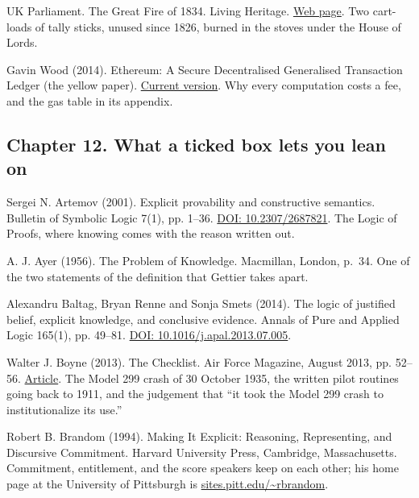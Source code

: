 \noindent UK Parliament. The Great Fire of 1834. Living Heritage. \href{https://www.parliament.uk/about/living-heritage/building/palace/architecture/palacestructure/great-fire/}{Web page}. Two cart-loads of tally sticks, unused since 1826, burned in the stoves under the House of Lords.
\par\medskip

\noindent Gavin Wood (2014). Ethereum: A Secure Decentralised Generalised Transaction Ledger (the yellow paper). \href{https://ethereum.github.io/yellowpaper/paper.pdf}{Current version}. Why every computation costs a fee, and the gas table in its appendix.
\par\medskip

\subsection*{Chapter 12. What a ticked box lets you lean on}

\noindent Sergei N. Artemov (2001). Explicit provability and constructive semantics. Bulletin of Symbolic Logic 7(1), pp. 1--36. \href{https://doi.org/10.2307/2687821}{DOI: 10.2307/2687821}. The Logic of Proofs, where knowing comes with the reason written out.
\par\medskip

\noindent A. J. Ayer (1956). The Problem of Knowledge. Macmillan, London, p.~34. One of the two statements of the definition that Gettier takes apart.
\par\medskip

\noindent Alexandru Baltag, Bryan Renne and Sonja Smets (2014). The logic of justified belief, explicit knowledge, and conclusive evidence. Annals of Pure and Applied Logic 165(1), pp. 49--81. \href{https://doi.org/10.1016/j.apal.2013.07.005}{DOI: 10.1016/j.apal.2013.07.005}.
\par\medskip

\noindent Walter J. Boyne (2013). The Checklist. Air Force Magazine, August 2013, pp. 52--56. \href{https://www.airandspaceforces.com/article/0813checklist/}{Article}. The Model 299 crash of 30 October 1935, the written pilot routines going back to 1911, and the judgement that ``it took the Model 299 crash to institutionalize its use.''
\par\medskip

\noindent Robert B. Brandom (1994). Making It Explicit: Reasoning, Representing, and Discursive Commitment. Harvard University Press, Cambridge, Massachusetts. Commitment, entitlement, and the score speakers keep on each other; his home page at the University of Pittsburgh is \href{https://sites.pitt.edu/~rbrandom/}{sites.pitt.edu/\textasciitilde rbrandom}.
\par\medskip

